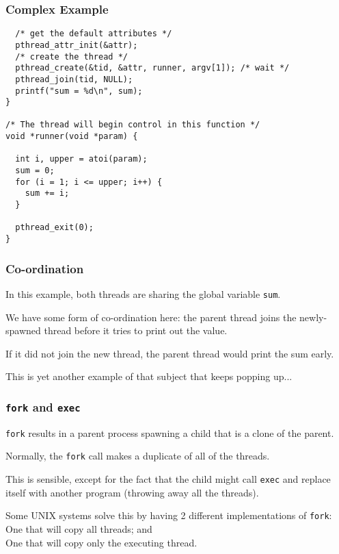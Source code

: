 \begin{frame}[fragile]
\frametitle{Complex Example}

\begin{verbatim}
  /* get the default attributes */
  pthread_attr_init(&attr);
  /* create the thread */
  pthread_create(&tid, &attr, runner, argv[1]); /* wait */
  pthread_join(tid, NULL); 
  printf("sum = %d\n", sum);
}

/* The thread will begin control in this function */ 
void *runner(void *param) {

  int i, upper = atoi(param);
  sum = 0;
  for (i = 1; i <= upper; i++) {
    sum += i;
  }
  
  pthread_exit(0);
}
\end{verbatim}


\end{frame}



\begin{frame}
\frametitle{Co-ordination}

In this example, both threads are sharing the global variable \texttt{sum}. 

We have some form of co-ordination here: the parent thread joins the newly-spawned thread before it tries to print out the value. 

If it did not join the new thread, the parent thread would print the sum early. 

This is yet another example of that subject that keeps popping up...

\end{frame}



\begin{frame}
\frametitle{\texttt{fork} and \texttt{exec}}

\texttt{fork} results in a parent process spawning a child that is a clone of the parent.

Normally, the \texttt{fork} call makes a duplicate of all of the threads.

This is sensible, except for the fact that the child might call \texttt{exec} and replace itself with another program (throwing away all the threads). 

Some UNIX systems solve this by having 2 different implementations of \texttt{fork}:\\ \quad One that will copy all threads; and\\
\quad One that will copy only the executing thread.


\end{frame}


